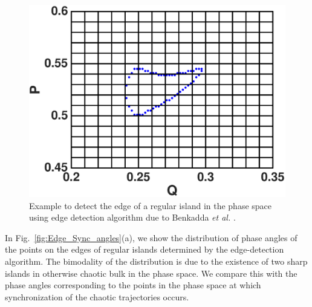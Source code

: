 \documentclass[reprint,superscriptaddress,amsmath,amssymb,aps,pre]{revtex4-1}
\begin{document}
\begin{figure}[b]
    \includegraphics[scale=0.42]{edge_reg_island.eps}
    \caption{\label{fig:edge_reg_island} \footnotesize Example to detect the 
    edge of a regular island in the phase space using edge detection 
    algorithm  due to Benkadda {\it et al.} \cite{Benkadda1997}. }
\end{figure}

In Fig.~\ref{fig:Edge_Sync_angles}(a), we show the distribution of phase angles of the points on the edges of regular islands determined by the edge-detection algorithm.  The bimodality of the distribution is due to the existence of two sharp islands in otherwise chaotic bulk in the phase space.  We compare this with the phase angles corresponding to the points in the phase space at which synchronization of the chaotic trajectories occurs.
\end{document}
